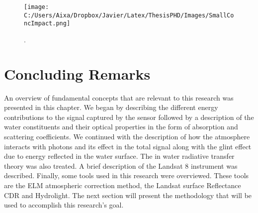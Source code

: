 \begin{figure}[htb]
\centering
      \texttt{[image: C:/Users/Aixa/Dropbox/Javier/Latex/ThesisPHD/Images/SmallConcImpact.png]}
      \caption{.\label{fig:SmallConcImpact} } 
\end{figure}



\section{Concluding Remarks}
An overview of fundamental concepts that are relevant to this research was presented in this chapter. We began by describing the different energy contributions to the signal captured by the sensor followed by a description of the water constituents and their optical properties in the form of absorption and scattering coefficients. We continued with the description of how the atmosphere interacts with photons and its effect in the total signal along with the glint effect due to energy reflected in the water surface. The in water radiative transfer theory was also treated. A brief description of the Landsat 8 instrument was described. Finally, some tools used in this research were overviewed. These tools are the ELM atmospheric correction method, the Landsat surface Reflectance CDR and Hydrolight. The next section will present the methodology that will be used to accomplish this research's goal.
